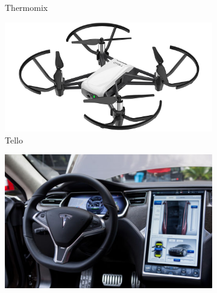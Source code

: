 \begin{figure}[!h]
\begin{subfigure}[b]{0.3\textwidth}
    \caption{Thermomix}
  \end{subfigure}
      \hfill
  \begin{subfigure}[b]{0.3\textwidth}
    \includegraphics[width=\textwidth, height=\textwidth]{drone.png}
    \caption{Tello}
  \end{subfigure}
      \hfill
  \begin{subfigure}[b]{0.3\textwidth}
    \includegraphics[width=\textwidth, height=\textwidth]{tesla.png}

\end{subfigure}
\end{figure}

